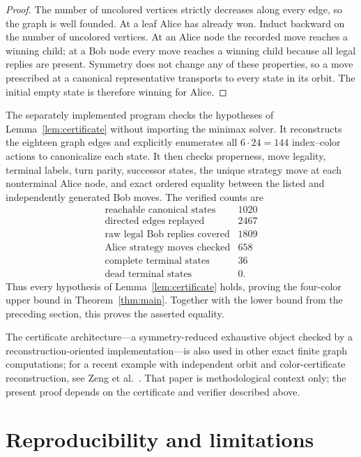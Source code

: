 \documentclass[11pt]{article}
\begin{document}
\begin{proof}
The number of uncolored vertices strictly decreases along every edge, so the
graph is well founded.  At a leaf Alice has already won.  Induct backward on
the number of uncolored vertices.  At an Alice node the recorded move reaches
a winning child; at a Bob node every move reaches a winning child because all
legal replies are present.  Symmetry does not change any of these properties,
so a move prescribed at a canonical representative transports to every state
in its orbit.  The initial empty state is therefore winning for Alice.
\end{proof}

The separately implemented program  checks the
hypotheses of Lemma~\ref{lem:certificate} without importing the minimax solver.
It reconstructs the eighteen graph edges and explicitly enumerates all
$6\cdot24=144$ index--color actions to canonicalize each state.  It then
checks properness, move legality, terminal labels, turn parity, successor
states, the unique strategy move at each nonterminal Alice node, and exact
ordered equality between the listed and independently generated Bob moves.
The verified counts are
\[
\begin{array}{c|r}
\text{reachable canonical states} & 1020\\
\text{directed edges replayed} & 2467\\
\text{raw legal Bob replies covered} & 1809\\
\text{Alice strategy moves checked} & 658\\
\text{complete terminal states} & 36\\
\text{dead terminal states} & 0.
\end{array}
\]
Thus every hypothesis of Lemma~\ref{lem:certificate} holds, proving the
four-color upper bound in Theorem~\ref{thm:main}.  Together with the lower
bound from the preceding section, this proves the asserted equality.

The certificate architecture---a symmetry-reduced exhaustive object checked
by a reconstruction-oriented implementation---is also used in other exact
finite graph computations; for a recent example with independent orbit and
color-certificate reconstruction, see Zeng et
al.~\cite{ZengLiuRatnaveluOng2026}.  That paper is methodological context only;
the present proof depends on the certificate and verifier described above.

\section{Reproducibility and limitations}
\end{document}

